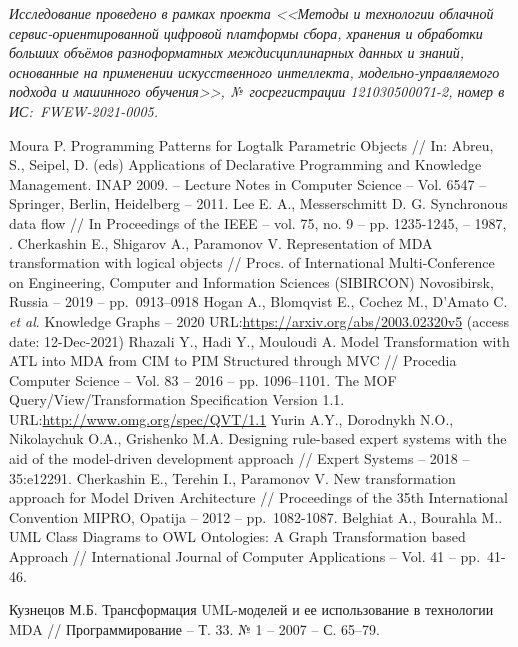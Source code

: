 \documentclass[12pt]{article}
\begin{document}
\textit{Исследование проведено в рамках проекта <<Методы и технологии облачной сервис-ориентированной цифровой платформы сбора, хранения и обработки больших объёмов разноформатных междисциплинарных данных и знаний, основанные на применении искусственного интеллекта, модельно-управляемого подхода и машинного обучения>>, №~госрегистрации 121030500071-2, номер в ИС:~FWEW-2021-0005.}
\renewcommand\refname{\centering Литература}
\begin{thebibliography}{99}
Moura P. Programming Patterns for Logtalk Parametric Objects // In: Abreu, S., Seipel, D. (eds) Applications of Declarative Programming and Knowledge Management. INAP 2009. -- Lecture Notes in Computer Science -- Vol. 6547 -- Springer, Berlin, Heidelberg -- 2011. 
Lee E. A., Messerschmitt D. G. Synchronous data flow // In Proceedings of the IEEE -- vol. 75, no. 9 -- pp. 1235-1245, -- 1987, .
 Cherkashin E., Shigarov A., Paramonov V. Representation of MDA transformation with logical objects // Procs. of International Multi-Conference on Engineering, Computer and Information Sciences (SIBIRCON) Novosibirsk, Russia -- 2019 -- pp.~0913--0918 
 Hogan A., Blomqvist E., Cochez M., D’Amato C. \emph{et al}. Knowledge Graphs -- 2020 URL:\url{https://arxiv.org/abs/2003.02320v5} (access date: 12-Dec-2021)
Rhazali Y., Hadi Y., Mouloudi A. Model Transformation with ATL into MDA from CIM to PIM Structured through MVC // Procedia Computer Science -- Vol. 83 -- 2016 -- pp. 1096–1101. 
 The MOF Query/View/Transformation Specification Version 1.1. URL:\url{http://www.omg.org/spec/QVT/1.1}
 Yurin A.Y., Dorodnykh N.O., Nikolaychuk O.A., Grishenko M.A. Designing rule-based expert systems with the aid of the model-driven development approach // Expert Systems -- 2018 -- 35:e12291. 
 Cherkashin E., Terehin I., Paramonov V. New transformation approach for Model Driven Architecture // Proceedings of the 35th International Convention MIPRO, Opatija -- 2012 -- pp.~1082-1087.
 Belghiat A., Bourahla M.. UML Class Diagrams to OWL Ontologies: A Graph Transformation based Approach // International Journal of Computer Applications -- Vol. 41 -- pp.~41-46.

Кузнецов М.Б. Трансформация UML-моделей и ее использование в технологии MDA // Программирование -- Т. 33. № 1 -- 2007 -- С. 65--79.



\end{thebibliography}
\end{document}
